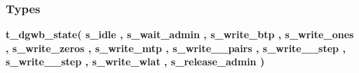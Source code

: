 \subsubsection*{Types}
 \begin{DoxyCompactItemize}
\item 
{\bfseries {\bf t\+\_\+dgwb\+\_\+state}{\bfseries \textcolor{vhdlchar}{(}\textcolor{vhdlchar}{ }\textcolor{vhdlchar}{s\+\_\+idle}\textcolor{vhdlchar}{ }\textcolor{vhdlchar}{,}\textcolor{vhdlchar}{ }\textcolor{vhdlchar}{s\+\_\+wait\+\_\+admin}\textcolor{vhdlchar}{ }\textcolor{vhdlchar}{,}\textcolor{vhdlchar}{ }\textcolor{vhdlchar}{s\+\_\+write\+\_\+btp}\textcolor{vhdlchar}{ }\textcolor{vhdlchar}{,}\textcolor{vhdlchar}{ }\textcolor{vhdlchar}{s\+\_\+write\+\_\+ones}\textcolor{vhdlchar}{ }\textcolor{vhdlchar}{,}\textcolor{vhdlchar}{ }\textcolor{vhdlchar}{s\+\_\+write\+\_\+zeros}\textcolor{vhdlchar}{ }\textcolor{vhdlchar}{,}\textcolor{vhdlchar}{ }\textcolor{vhdlchar}{s\+\_\+write\+\_\+mtp}\textcolor{vhdlchar}{ }\textcolor{vhdlchar}{,}\textcolor{vhdlchar}{ }\textcolor{vhdlchar}{s\+\_\+write\+\_\+\_\+pairs}\textcolor{vhdlchar}{ }\textcolor{vhdlchar}{,}\textcolor{vhdlchar}{ }\textcolor{vhdlchar}{s\+\_\+write\+\_\+\_\+step}\textcolor{vhdlchar}{ }\textcolor{vhdlchar}{,}\textcolor{vhdlchar}{ }\textcolor{vhdlchar}{s\+\_\+write\+\_\+\_\+step}\textcolor{vhdlchar}{ }\textcolor{vhdlchar}{,}\textcolor{vhdlchar}{ }\textcolor{vhdlchar}{s\+\_\+write\+\_\+wlat}\textcolor{vhdlchar}{ }\textcolor{vhdlchar}{,}\textcolor{vhdlchar}{ }\textcolor{vhdlchar}{s\+\_\+release\+\_\+admin}\textcolor{vhdlchar}{ }\textcolor{vhdlchar}{)}\textcolor{vhdlchar}{ }}} 
\end{DoxyCompactItemize}
